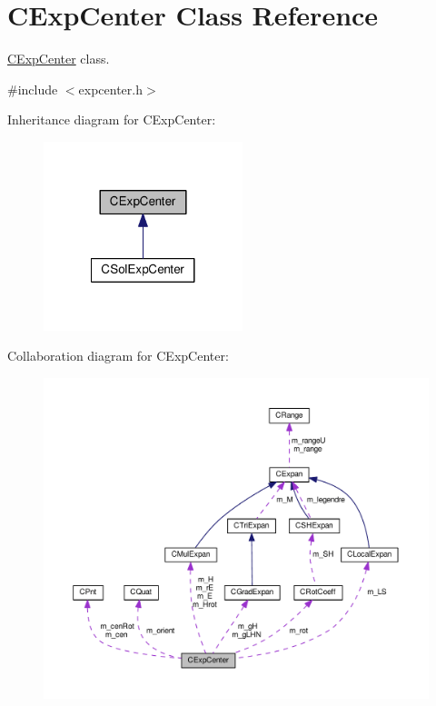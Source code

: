 \hypertarget{classCExpCenter}{\section{C\-Exp\-Center Class Reference}
\label{classCExpCenter}
}


\hyperlink{classCExpCenter}{C\-Exp\-Center} class.  




{\ttfamily \#include $<$expcenter.\-h$>$}



Inheritance diagram for C\-Exp\-Center\-:\nopagebreak
\begin{figure}[H]
\begin{center}
\leavevmode
\includegraphics[width=164pt]{classCExpCenter__inherit__graph}
\end{center}
\end{figure}


Collaboration diagram for C\-Exp\-Center\-:\nopagebreak
\begin{figure}[H]
\begin{center}
\leavevmode
\includegraphics[width=350pt]{classCExpCenter__coll__graph}
\end{center}
\end{figure}
